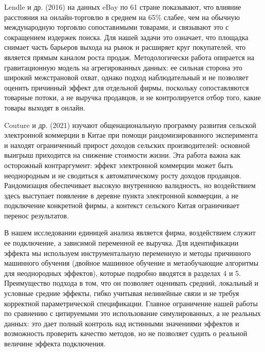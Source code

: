 \documentclass[12pt,a4paper]{article}
\begin{document}
Lendle и др. (2016) на данных eBay по 61 стране показывают, что влияние расстояния на онлайн-торговлю в среднем на 65\% слабее, чем на обычную международную торговлю сопоставимыми товарами, и связывают это с сокращением издержек поиска. Для нашей задачи это означает, что площадка снимает часть барьеров выхода на рынок и расширяет круг покупателей, что является прямым каналом роста продаж. Методологически работа опирается на гравитационную модель на агрегированных данных: ее сильная сторона это широкий межстрановой охват, однако подход наблюдательный и не позволяет оценить причинный эффект для отдельной фирмы, поскольку сопоставляются товарные потоки, а не выручка продавцов, и не контролируется отбор того, какие товары выходят в онлайн.

Couture и др. (2021) изучают общенациональную программу развития сельской электронной коммерции в Китае при помощи рандомизированного эксперимента и находят ограниченный прирост доходов сельских производителей: основной выигрыш приходится на снижение стоимости жизни. Эта работа важна как осторожный контраргумент: эффект электронной коммерции может быть неоднородным и не сводиться к автоматическому росту доходов продавцов. Рандомизация обеспечивает высокую внутреннюю валидность, но воздействием здесь выступает появление в деревне пункта электронной коммерции, а не подключение конкретной фирмы, а контекст сельского Китая ограничивает перенос результатов.

В нашем исследовании единицей анализа является фирма, воздействием служит ее подключение, а зависимой переменной ее выручка. Для идентификации эффекта мы используем инструментальную переменную и методы причинного машинного обучения (двойное машинное обучение и метаобучающие алгоритмы для неоднородных эффектов), которые подробно вводятся в разделах 4 и 5. Преимущество подхода в том, что он позволяет оценивать средний, локальный и условные средние эффекты, гибко учитывая нелинейные связи и не требуя корректной параметрической спецификации. Главное ограничение нашей работы по сравнению с цитируемыми это использование симулированных, а не реальных данных: это дает полный контроль над истинными значениями эффектов и возможность проверить качество методов, но не позволяет судить о реальной величине эффекта подключения.
\end{document}
